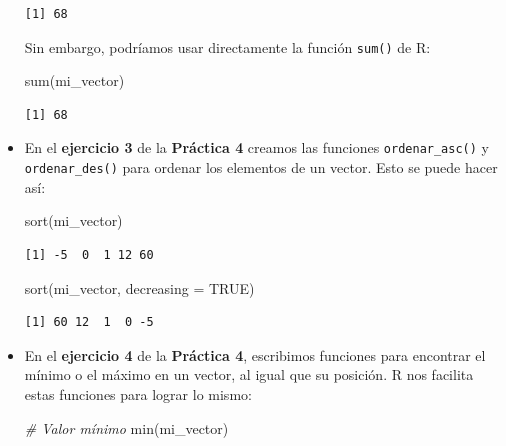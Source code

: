 \documentclass[
]{book}
\newenvironment{Shaded}{\begin{snugshade}}{\end{snugshade}}
\newcommand{\AttributeTok}[1]{\textcolor[rgb]{0.77,0.63,0.00}{#1}}
\newcommand{\CommentTok}[1]{\textcolor[rgb]{0.56,0.35,0.01}{\textit{#1}}}
\newcommand{\ConstantTok}[1]{\textcolor[rgb]{0.00,0.00,0.00}{#1}}
\newcommand{\FunctionTok}[1]{\textcolor[rgb]{0.00,0.00,0.00}{#1}}
\newcommand{\NormalTok}[1]{#1}
\begin{document}
\begin{itemize}
\begin{verbatim}
[1] 68
\end{verbatim}

  Sin embargo, podríamos usar directamente la función \texttt{sum()} de R:

\begin{Shaded}
\begin{Highlighting}[]
\FunctionTok{sum}\NormalTok{(mi\_vector)}
\end{Highlighting}
\end{Shaded}

\begin{verbatim}
[1] 68
\end{verbatim}
\item
  En el \textbf{ejercicio 3} de la \textbf{Práctica 4} creamos las funciones \texttt{ordenar\_asc()} y \texttt{ordenar\_des()} para ordenar los elementos de un vector. Esto se puede hacer así:

\begin{Shaded}
\begin{Highlighting}[]
\FunctionTok{sort}\NormalTok{(mi\_vector)}
\end{Highlighting}
\end{Shaded}

\begin{verbatim}
[1] -5  0  1 12 60
\end{verbatim}

\begin{Shaded}
\begin{Highlighting}[]
\FunctionTok{sort}\NormalTok{(mi\_vector, }\AttributeTok{decreasing =} \ConstantTok{TRUE}\NormalTok{)}
\end{Highlighting}
\end{Shaded}

\begin{verbatim}
[1] 60 12  1  0 -5
\end{verbatim}
\item
  En el \textbf{ejercicio 4} de la \textbf{Práctica 4}, escribimos funciones para encontrar el mínimo o el máximo en un vector, al igual que su posición. R nos facilita estas funciones para lograr lo mismo:

\begin{Shaded}
\begin{Highlighting}[]
\CommentTok{\# Valor mínimo}
\FunctionTok{min}\NormalTok{(mi\_vector)}
\end{Highlighting}
\end{Shaded}


\end{itemize}
\end{document}
